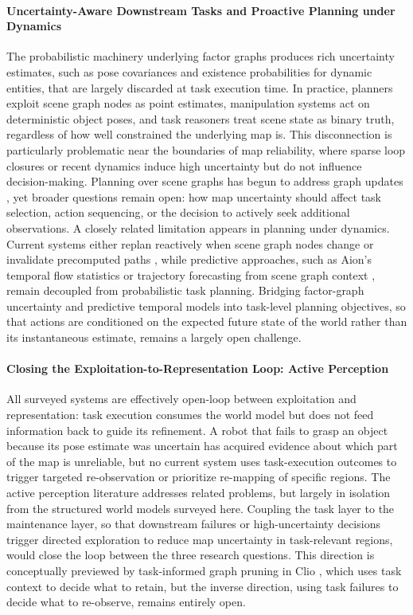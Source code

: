 \paragraph{Uncertainty-Aware Downstream Tasks and Proactive Planning under Dynamics}
The probabilistic machinery underlying factor graphs produces rich uncertainty estimates, such as pose covariances and existence probabilities for dynamic entities, that are largely discarded at task execution time. 
In practice, planners exploit scene graph nodes as point estimates, manipulation systems act on deterministic object poses, and task reasoners treat scene state as binary truth, regardless of how well constrained the underlying map is. 
This disconnection is particularly problematic near the boundaries of map reliability, where sparse loop closures or recent dynamics induce high uncertainty but do not influence decision-making. 
Planning over scene graphs has begun to address graph updates \cite{ejaz2025situationallyawarepathplanningexploiting}, yet broader questions remain open: how map uncertainty should affect task selection, action sequencing, or the decision to actively seek additional observations. 
A closely related limitation appears in planning under dynamics. 
Current systems either replan reactively when scene graph nodes change or invalidate precomputed paths \cite{ejaz2025situationallyawarepathplanningexploiting}, while predictive approaches, such as Aion’s temporal flow statistics \cite{catalano_aion_2025} or trajectory forecasting from scene graph context \cite{gorlo_long-term_2024}, remain decoupled from probabilistic task planning. 
Bridging factor-graph uncertainty and predictive temporal models into task-level planning objectives, so that actions are conditioned on the expected future state of the world rather than its instantaneous estimate, remains a largely open challenge.

\paragraph{Closing the Exploitation-to-Representation Loop: Active Perception}
All surveyed systems are effectively open-loop between exploitation and representation: task execution consumes the world model but does not feed information back to guide its refinement. 
A robot that fails to grasp an object because its pose estimate was uncertain has acquired evidence about which part of the map is unreliable, but no current system uses task-execution outcomes to trigger targeted re-observation or prioritize re-mapping of specific regions. 
The active perception literature addresses related problems, but largely in isolation from the structured world models surveyed here. 
Coupling the task layer to the maintenance layer, so that downstream failures or high-uncertainty decisions trigger directed exploration to reduce map uncertainty in task-relevant regions, would close the loop between the three research questions. 
This direction is conceptually previewed by task-informed graph pruning in Clio \cite{maggio_clio_2024}, which uses task context to decide what to retain, but the inverse direction, using task failures to decide what to re-observe, remains entirely open.

